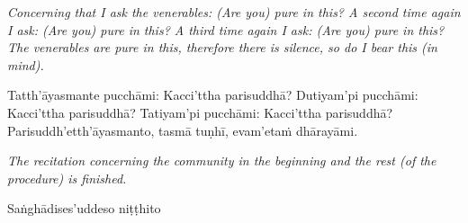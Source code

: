 \documentclass[11pt]{article}
\begin{document}
\begin{paracol}{2}
\begin{column}
{\itshape\footnotesize
Concerning that I ask the venerables: (Are you) pure in this? 
A second time again I ask: (Are you) pure in this? 
A third time again I ask: (Are you) pure in this? The venerables are pure in this, therefore there is silence, so do I bear this (in mind).
}
\switchcolumn

\begin{flushleft}
Tatth’āyasmante pucchāmi: Kacci’ttha parisuddhā?
Dutiyam’pi pucchāmi: Kacci’ttha parisuddhā?
Tatiyam’pi pucchāmi: Kacci’ttha parisuddhā?
Parisuddh’etth’āyasmanto, tasmā tuṇhī, evam’etaṁ dhārayāmi.
\switchcolumn*
\end{flushleft}

{\itshape\footnotesize
The recitation concerning the community in the beginning and the rest (of the procedure) is finished.
}
\switchcolumn

\begin{flushleft}
Saṅghādises’uddeso niṭṭhito
\switchcolumn*
\end{flushleft}


\end{column}
\end{paracol}
\end{document}
